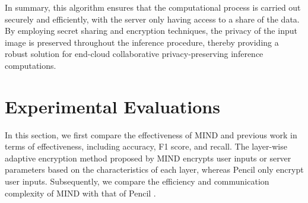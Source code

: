\documentclass[conference]{IEEEtran}
\newcommand{\DEnc}{\texttt{DEnc}}
\newcommand{\PEnc}{\texttt{PEnc}}
\begin{document}


In summary, this algorithm ensures that the computational process is carried out securely and efficiently, with the server only having access to a share of the data. By employing secret sharing and encryption techniques, the privacy of the input image is preserved throughout the inference procedure, thereby providing a robust solution for end-cloud collaborative privacy-preserving inference computations.



\section{Experimental Evaluations}

In this section, we first compare the effectiveness of MIND and previous work \cite{liu2024pencilprivateextensiblecollaborative} in terms of effectiveness, including accuracy, F1 score, and recall.
The layer-wise adaptive encryption method proposed by MIND encrypts user inputs or server parameters based on the characteristics of each layer, whereas Pencil \cite{liu2024pencilprivateextensiblecollaborative} only encrypt user inputs.
Subsequently, we compare the efficiency and communication complexity of MIND with that of Pencil \cite{liu2024pencilprivateextensiblecollaborative}.
\end{document}
